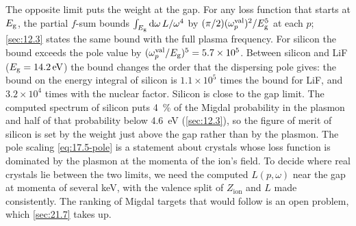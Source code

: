 The opposite limit puts the weight at the gap. For any loss function that starts at $E_{\mathrm{g}}$, the partial $f$-sum bounds $\int_{E_{\mathrm{g}}}\mathrm{d}\omega\,L/\omega^4$ by $(\pi/2)(\omega_p^{\mathrm{val}})^2/E_{\mathrm{g}}^5$ at each $p$; \cref{sec:12.3} states the same bound with the full plasma frequency. For silicon the bound exceeds the pole value by $(\omega_p^{\mathrm{val}}/E_{\mathrm{g}})^5 = 5.7\times10^5$. Between silicon and LiF ($E_{\mathrm{g}} = \SI{14.2}{eV}$) the bound changes the order that the dispersing pole gives: the bound on the energy integral of silicon is $1.1\times10^5$ times the bound for LiF, and $3.2\times10^4$ times with the nuclear factor. Silicon is close to the gap limit. The computed spectrum of silicon puts \SI{4}{\percent} of the Migdal probability in the plasmon and half of that probability below \SI{4.6}{eV} (\cref{sec:12.3}), so the figure of merit of silicon is set by the weight just above the gap rather than by the plasmon. The pole scaling \cref{eq:17.5-pole} is a statement about crystals whose loss function is dominated by the plasmon at the momenta of the ion's field. To decide where real crystals lie between the two limits, we need the computed $L(p,\omega)$ near the gap at momenta of several keV, with the valence split of $Z_{\mathrm{ion}}$ and $L$ made consistently. The ranking of Migdal targets that would follow is an open problem, which \cref{sec:21.7} takes up.
